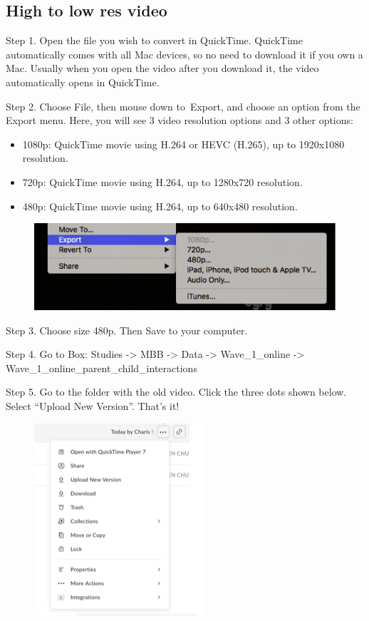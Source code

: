 \documentclass[]{book}
\providecommand{\tightlist}{%
  \setlength{\itemsep}{0pt}\setlength{\parskip}{0pt}}
\begin{document}
\hypertarget{high-to-low-res-video}{%
\subsection{High to low res video}\label{high-to-low-res-video}}

Step 1. Open the file you wish to convert in QuickTime. QuickTime automatically comes with all Mac devices, so no need to download it if you own a Mac. Usually when you open the video after you download it, the video automatically opens in QuickTime.

Step 2. Choose File, then mouse down to~Export, and choose an option from the Export menu.
Here, you will see 3 video resolution options and 3 other options:

\begin{itemize}
\tightlist
\item
  1080p: QuickTime movie using H.264 or HEVC (H.265), up to 1920x1080 resolution.
\item
  720p: QuickTime movie using H.264, up to 1280x720 resolution.
\item
  480p: QuickTime movie using H.264, up to 640x480 resolution.
\end{itemize}

\begin{figure}
\centering
\includegraphics{images/lab_protocols/video_resolution/1.png}
\caption{}
\end{figure}

Step 3. Choose size 480p. Then Save to your computer.

Step 4. Go to Box: Studies -\textgreater{} MBB -\textgreater{} Data -\textgreater{} Wave\_1\_online -\textgreater{} Wave\_1\_online\_parent\_child\_interactions

Step 5. Go to the folder with the old video. Click the three dots shown below. Select ``Upload New Version''. That's it!

\begin{figure}
\centering
\includegraphics{images/lab_protocols/video_resolution/2.png}
\caption{}
\end{figure}
\end{document}
